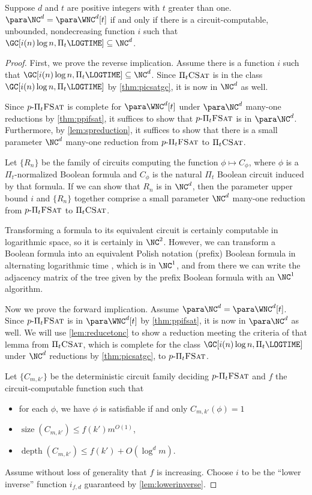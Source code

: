 \documentclass{article}
\newcommand{\dash}{\textnormal{-}}
\newcommand{\pPiFSAT}{p \dash \Pi_t \textsc{FSat}}
\newcommand{\PiCSAT}{\Pi_t \textsc{CSat}}
\DeclareMathOperator{\depth}{depth}
\DeclareMathOperator{\size}{size}
\begin{document}
\begin{theorem}\label{thm:ncwnct}
  Suppose $d$ and $t$ are positive integers with $t$ greater than one.
  $\para \NC^d = \para \WNC^d[t]$ if and only if there is a circuit-computable, unbounded, nondecreasing function $i$ such that %
  $\GC[i(n) \log n, \Pi_t \LOGTIME] \subseteq \NC^d$.
\end{theorem}
\begin{proof}
  First, we prove the reverse implication.
  Assume there is a function $i$ such that $\GC[i(n) \log n, \Pi_t \LOGTIME] \subseteq \NC^d$.
  Since $\PiCSAT$ is in the class $\GC[i(n) \log n, \Pi_t \LOGTIME]$ by \autoref{thm:picsatgc}, it is now in $\NC^d$ as well.

  Since $\pPiFSAT$ is complete for $\para \WNC^d[t]$ under $\para \NC^d$ many-one reductions by \autoref{thm:ppifsat}, it suffices to show that $\pPiFSAT$ is in $\para \NC^d$.
  Furthermore, by \autoref{lem:spreduction}, it suffices to show that there is a small parameter $\NC^d$ many-one reduction from $\pPiFSAT$ to $\PiCSAT$.

  Let $\{R_n\}$ be the family of circuits computing the function $\phi \mapsto C_\phi$, where $\phi$ is a $\Pi_t$-normalized Boolean formula and $C_\phi$ is the natural $\Pi_t$ Boolean circuit induced by that formula.
  If we can show that $R_n$ is in $\NC^d$, then the parameter upper bound $i$ and $\{R_n\}$ together comprise a small parameter $\NC^d$ many-one reduction from $\pPiFSAT$ to $\PiCSAT$.

  Transforming a formula to its equivalent circuit is certainly computable in logarithmic space, so it is certainly in $\NC^2$.
  However, we can transform a Boolean formula into an equivalent Polish notation (prefix) Boolean formula in alternating logarithmic time \autocite{buss87}, which is in $\NC^1$, and from there we can write the adjacency matrix of the tree given by the prefix Boolean formula with an $\NC^1$ algorithm.

  Now we prove the forward implication.
  Assume $\para \NC^d = \para \WNC^d[t]$.
  Since $\pPiFSAT$ is in $\para \WNC^d[t]$ by \autoref{thm:ppifsat}, it is now in $\para \NC^d$ as well.
  We will use \autoref{lem:reducetonc} to show a reduction meeting the criteria of that lemma from $\PiCSAT$, which is complete for the class $\GC[i(n) \log n, \Pi_t \LOGTIME]$ under $\NC^d$ reductions by \autoref{thm:picsatgc}, to $\pPiFSAT$.

  Let $\{C_{m, k'}\}$ be the deterministic circuit family deciding $\pPiFSAT$ and $f$ the circuit-computable function such that
  \begin{itemize}
  \item for each $\phi$, we have $\phi$ is satisfiable if and only $C_{m, k'}(\phi) = 1$
  \item $\size(C_{m, k'}) \leq f(k') m^{O(1)}$,
  \item $\depth(C_{m, k'}) \leq f(k') + O(\log^d m)$.
  \end{itemize}
  Assume without loss of generality that $f$ is increasing.
  Choose $i$ to be the ``lower inverse'' function $i_{f, d}$ guaranteed by \autoref{lem:lowerinverse}.


\end{proof}
\end{document}
